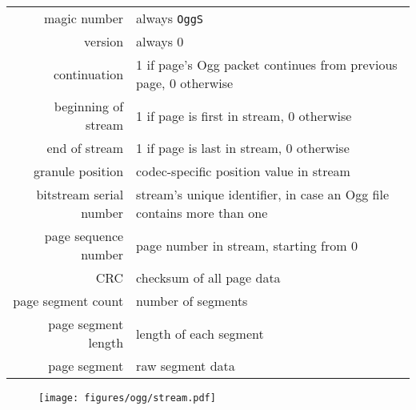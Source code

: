 \begin{table}[h]
{
\begin{tabular}{rl}
\textsf{magic number} & always \texttt{OggS} \\
\textsf{version} & always 0 \\
\textsf{continuation} & 1 if page's Ogg packet continues from previous page, 0 otherwise \\
\textsf{beginning of stream} & 1 if page is first in stream, 0 otherwise \\
\textsf{end of stream} & 1 if page is last in stream, 0 otherwise \\
\textsf{granule position} & codec-specific position value in stream \\
\textsf{bitstream serial number} & stream's unique identifier, in case an Ogg file contains more than one \\
\textsf{page sequence number} & page number in stream, starting from 0 \\
\textsf{CRC} & checksum of all page data \\
\textsf{page segment count} & number of segments \\
\textsf{page segment length} & length of each segment \\
\textsf{page segment} & raw segment data \\
\end{tabular}
}
\end{table}
\clearpage

\begin{figure}[h]
  \texttt{[image: figures/ogg/stream.pdf]}
\end{figure}

\clearpage

